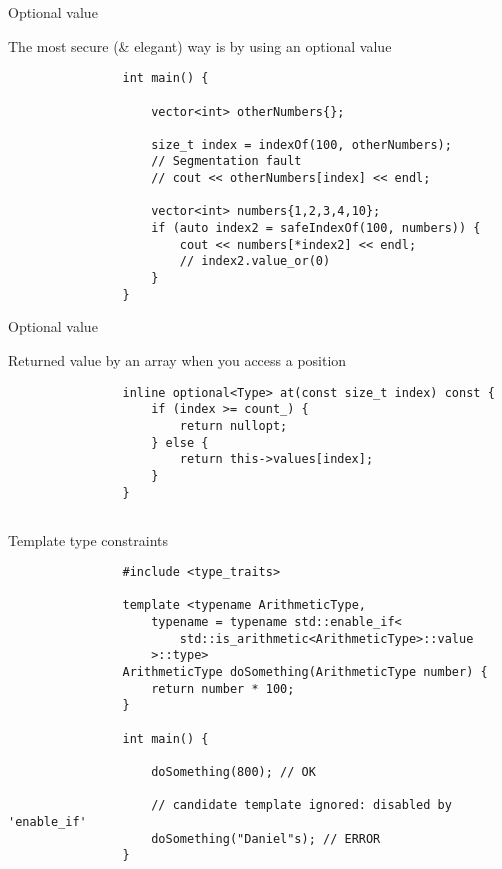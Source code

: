 \documentclass{beamer}
\newcommand{\normalSizeItem}[1] {
  \normalsize{\item #1}
}
\begin{document}
		\begin{frame}[fragile]{Optional value}	
			\begin{itemize}
				\normalSizeItem { The most secure (\& elegant) way is by using an optional value }
				\begin{lstlisting}
				int main() {
	
					vector<int> otherNumbers{};
				
					size_t index = indexOf(100, otherNumbers);
					// Segmentation fault
					// cout << otherNumbers[index] << endl;
					
					vector<int> numbers{1,2,3,4,10};
					if (auto index2 = safeIndexOf(100, numbers)) {
						cout << numbers[*index2] << endl;
						// index2.value_or(0)
					}
				}
				\end{lstlisting}
			\end{itemize}
		\end{frame}
		
		\begin{frame}[fragile]{Optional value}
			\begin{itemize}
				\normalSizeItem { Returned value by an array when you access a position }
				\begin{lstlisting}
				inline optional<Type> at(const size_t index) const {
					if (index >= count_) {
						return nullopt;
					} else {
						return this->values[index];
					}
				}
				\end{lstlisting}
			\end{itemize}
		\end{frame}
		
		\begin{frame}[fragile]{}
			\subsection{}	
			\begin{itemize}
				\normalSizeItem { Template type constraints }
				\begin{lstlisting}
				#include <type_traits>
				
				template <typename ArithmeticType, 
					typename = typename std::enable_if<
						std::is_arithmetic<ArithmeticType>::value
					>::type>
				ArithmeticType doSomething(ArithmeticType number) {
					return number * 100;
				}
				
				int main() {
				
					doSomething(800); // OK
					
					// candidate template ignored: disabled by 'enable_if'
					doSomething("Daniel"s); // ERROR 
				}
				\end{lstlisting}
			\end{itemize}
		\end{frame}
		
\end{document}
